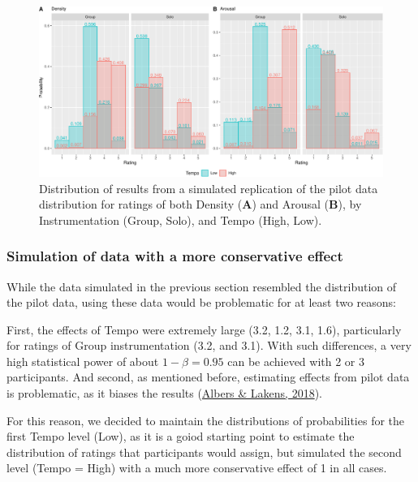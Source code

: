\documentclass[
  bookmarksnumbered]{article}
\begin{document}
\begin{figure}
\centering
\includegraphics{Power_analysis_files/figure-latex/pilot-rep-1.pdf}
\caption{\label{fig:pilot-rep}Distribution of results from a simulated replication of the pilot data distribution for ratings of both Density (\textbf{A}) and Arousal (\textbf{B}), by Instrumentation (Group, Solo), and Tempo (High, Low).}
\end{figure}

\hypertarget{simulation-of-data-with-a-more-conservative-effect}{%
\subsubsection{Simulation of data with a more conservative effect}\label{simulation-of-data-with-a-more-conservative-effect}}

While the data simulated in the previous section resembled the distribution of the pilot data, using these data would be problematic for at least two reasons:

First, the effects of Tempo were extremely large (3.2, 1.2, 3.1, 1.6), particularly for ratings of Group instrumentation (3.2, and 3.1). With such differences, a very high statistical power of about \(1 - \beta = 0.95\) can be achieved with 2 or 3 participants. And second, as mentioned before, estimating effects from pilot data is problematic, as it biases the results (\protect\hyperlink{ref-albersWhenPowerAnalyses2018}{Albers \& Lakens, 2018}).

For this reason, we decided to maintain the distributions of probabilities for the first Tempo level (Low), as it is a goiod starting point to estimate the distribution of ratings that participants would assign, but simulated the second level (Tempo = High) with a much more conservative effect of 1 in all cases.
\end{document}
